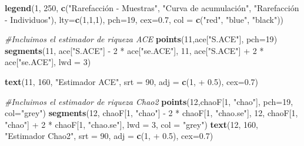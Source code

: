 \documentclass[]{book}
\newenvironment{Shaded}{\begin{snugshade}}{\end{snugshade}}
\newcommand{\KeywordTok}[1]{\textcolor[rgb]{0.13,0.29,0.53}{\textbf{{#1}}}}
\newcommand{\DataTypeTok}[1]{\textcolor[rgb]{0.13,0.29,0.53}{{#1}}}
\newcommand{\DecValTok}[1]{\textcolor[rgb]{0.00,0.00,0.81}{{#1}}}
\newcommand{\FloatTok}[1]{\textcolor[rgb]{0.00,0.00,0.81}{{#1}}}
\newcommand{\StringTok}[1]{\textcolor[rgb]{0.31,0.60,0.02}{{#1}}}
\newcommand{\CommentTok}[1]{\textcolor[rgb]{0.56,0.35,0.01}{\textit{{#1}}}}
\newcommand{\NormalTok}[1]{{#1}}
\begin{document}
\begin{Shaded}
\begin{Highlighting}[]
\KeywordTok{legend}\NormalTok{(}\DecValTok{1}\NormalTok{, }\DecValTok{250}\NormalTok{, }\KeywordTok{c}\NormalTok{(}\StringTok{"Rarefacción - Muestras"}\NormalTok{, }\StringTok{"Curva de acumulación"}\NormalTok{,}
                 \StringTok{"Rarefacción - Individuos"}\NormalTok{), }\DataTypeTok{lty=}\KeywordTok{c}\NormalTok{(}\DecValTok{1}\NormalTok{,}\DecValTok{1}\NormalTok{,}\DecValTok{1}\NormalTok{), }\DataTypeTok{pch=}\DecValTok{19}\NormalTok{,}
       \DataTypeTok{cex=}\FloatTok{0.7}\NormalTok{, }\DataTypeTok{col =} \KeywordTok{c}\NormalTok{(}\StringTok{"red"}\NormalTok{, }\StringTok{"blue"}\NormalTok{, }\StringTok{"black"}\NormalTok{))}

\CommentTok{#Incluimos el estimador de riqueza ACE}
\KeywordTok{points}\NormalTok{(}\DecValTok{11}\NormalTok{,ace[}\StringTok{"S.ACE"}\NormalTok{], }\DataTypeTok{pch=}\DecValTok{19}\NormalTok{)}
\KeywordTok{segments}\NormalTok{(}\DecValTok{11}\NormalTok{, ace[}\StringTok{"S.ACE"}\NormalTok{] -}\StringTok{ }\DecValTok{2} \NormalTok{*}\StringTok{ }\NormalTok{ace[}\StringTok{"se.ACE"}\NormalTok{], }
         \DecValTok{11}\NormalTok{, ace[}\StringTok{"S.ACE"}\NormalTok{] +}\StringTok{ }\DecValTok{2} \NormalTok{*}\StringTok{ }\NormalTok{ace[}\StringTok{"se.ACE"}\NormalTok{], }\DataTypeTok{lwd =} \DecValTok{3}\NormalTok{) }

\KeywordTok{text}\NormalTok{(}\DecValTok{11}\NormalTok{, }\DecValTok{160}\NormalTok{, }\StringTok{"Estimador ACE"}\NormalTok{, }\DataTypeTok{srt =} \DecValTok{90}\NormalTok{, }\DataTypeTok{adj =} \KeywordTok{c}\NormalTok{(}\DecValTok{1}\NormalTok{, +}\StringTok{ }\FloatTok{0.5}\NormalTok{), }\DataTypeTok{cex=}\FloatTok{0.7}\NormalTok{)}

\CommentTok{#Incluimos el estimador de riqueza Chao2}
\KeywordTok{points}\NormalTok{(}\DecValTok{12}\NormalTok{,chaoF[}\DecValTok{1}\NormalTok{, }\StringTok{"chao"}\NormalTok{], }\DataTypeTok{pch=}\DecValTok{19}\NormalTok{, }\DataTypeTok{col=}\StringTok{"grey"}\NormalTok{)}
\KeywordTok{segments}\NormalTok{(}\DecValTok{12}\NormalTok{, chaoF[}\DecValTok{1}\NormalTok{, }\StringTok{"chao"}\NormalTok{] -}\StringTok{ }\DecValTok{2} \NormalTok{*}\StringTok{ }\NormalTok{chaoF[}\DecValTok{1}\NormalTok{, }
                \StringTok{"chao.se"}\NormalTok{], }\DecValTok{12}\NormalTok{, chaoF[}\DecValTok{1}\NormalTok{, }\StringTok{"chao"}\NormalTok{] +}\StringTok{ }\DecValTok{2} \NormalTok{*}\StringTok{ }\NormalTok{chaoF[}\DecValTok{1}\NormalTok{,}
                \StringTok{"chao.se"}\NormalTok{], }\DataTypeTok{lwd =} \DecValTok{3}\NormalTok{, }\DataTypeTok{col =} \StringTok{"grey"}\NormalTok{) }
\KeywordTok{text}\NormalTok{(}\DecValTok{12}\NormalTok{, }\DecValTok{160}\NormalTok{, }\StringTok{"Estimador Chao2"}\NormalTok{, }\DataTypeTok{srt =} \DecValTok{90}\NormalTok{, }\DataTypeTok{adj =} \KeywordTok{c}\NormalTok{(}\DecValTok{1}\NormalTok{, +}\StringTok{ }\FloatTok{0.5}\NormalTok{), }\DataTypeTok{cex=}\FloatTok{0.7}\NormalTok{)}


\end{Highlighting}
\end{Shaded}
\end{document}
